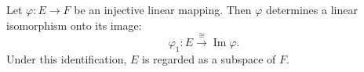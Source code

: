 Let $\varphi: E \to F$ be an injective linear mapping. Then $\varphi$ determines a linear isomorphism onto its image:
$$
\varphi_1: E \xrightarrow{\cong} \operatorname{Im} \varphi.
$$
Under this identification, $E$ is regarded as a subspace of $F$.
